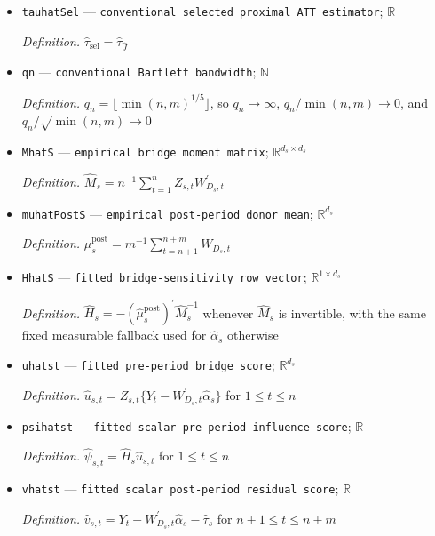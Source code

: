 \documentclass{article}
\begin{document}
\begin{itemize}
  \par\smallskip\noindent\emph{Definition.} \(\widehat\tau_s=m^{-1}\sum_{t=n+1}^{n+m}\{Y_t-W_{D_s,t}^{\prime}\widehat\alpha_s\}\)
  \item \texttt{tauhatSel} --- \texttt{conventional selected proximal ATT estimator}; \(\mathbb R\)
  \par\smallskip\noindent\emph{Definition.} \(\widehat\tau_{\mathrm{sel}}=\widehat\tau_{\widehat J}\)
  \item \texttt{qn} --- \texttt{conventional Bartlett bandwidth}; \(\mathbb N\)
  \par\smallskip\noindent\emph{Definition.} \(q_n=\lfloor\min(n,m)^{1/5}\rfloor\), so \(q_n\to\infty\), \(q_n/\min(n,m)\to0\), and \(q_n/\sqrt{\min(n,m)}\to0\)
  \item \texttt{MhatS} --- \texttt{empirical bridge moment matrix}; \(\mathbb R^{d_s\times d_s}\)
  \par\smallskip\noindent\emph{Definition.} \(\widehat M_s=n^{-1}\sum_{t=1}^n Z_{s,t}W_{D_s,t}^{\prime}\)
  \item \texttt{muhatPostS} --- \texttt{empirical post-\allowbreak{}period donor mean}; \(\mathbb R^{d_s}\)
  \par\smallskip\noindent\emph{Definition.} \(\widehat\mu_s^{\mathrm{post}}=m^{-1}\sum_{t=n+1}^{n+m}W_{D_s,t}\)
  \item \texttt{HhatS} --- \texttt{fitted bridge-\allowbreak{}sensitivity row vector}; \(\mathbb R^{1\times d_s}\)
  \par\smallskip\noindent\emph{Definition.} \(\widehat H_s=-(\widehat\mu_s^{\mathrm{post}})^{\prime}\widehat M_s^{-1}\) whenever \(\widehat M_s\) is invertible, with the same fixed measurable fallback used for \(\widehat\alpha_s\) otherwise
  \item \texttt{uhatst} --- \texttt{fitted pre-\allowbreak{}period bridge score}; \(\mathbb R^{d_s}\)
  \par\smallskip\noindent\emph{Definition.} \(\widehat u_{s,t}=Z_{s,t}\{Y_t-W_{D_s,t}^{\prime}\widehat\alpha_s\}\) for \(1\leq t\leq n\)
  \item \texttt{psihatst} --- \texttt{fitted scalar pre-\allowbreak{}period influence score}; \(\mathbb R\)
  \par\smallskip\noindent\emph{Definition.} \(\widehat\psi_{s,t}=\widehat H_s\widehat u_{s,t}\) for \(1\leq t\leq n\)
  \item \texttt{vhatst} --- \texttt{fitted scalar post-\allowbreak{}period residual score}; \(\mathbb R\)
  \par\smallskip\noindent\emph{Definition.} \(\widehat v_{s,t}=Y_t-W_{D_s,t}^{\prime}\widehat\alpha_s-\widehat\tau_s\) for \(n+1\leq t\leq n+m\)

\end{itemize}
\end{document}
